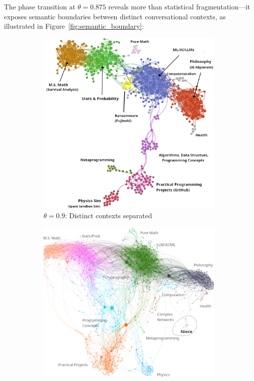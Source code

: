 The phase transition at $\theta = 0.875$ reveals more than statistical fragmentation—it exposes semantic boundaries between distinct conversational contexts, as illustrated in Figure~\ref{fig:semantic_boundary}:

\begin{figure}[h]
\centering
\begin{subfigure}{0.48\textwidth}
    \centering
    \includegraphics[width=\textwidth]{./images/cluster-vis-topics-better.png}
    \caption{$\theta=0.9$: Distinct contexts separated}
\end{subfigure}
\hfill
\begin{subfigure}{0.48\textwidth}
    \centering
    \includegraphics[width=\textwidth]{./images/0.875-wild-better.png}

\end{subfigure}
\end{figure}
